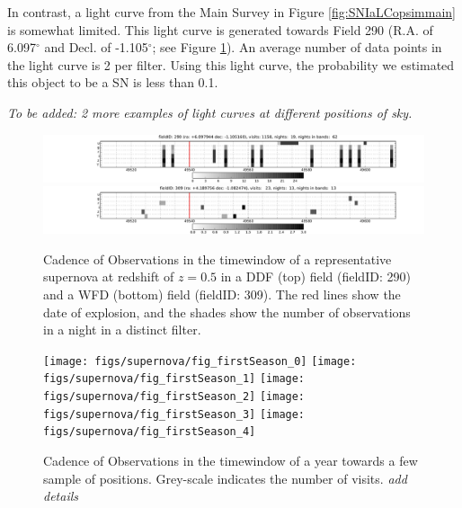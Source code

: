 In contrast, a light curve from the Main Survey in Figure \ref{fig:SNIaLCopsimmain} is
somewhat limited. 
This light curve is generated towards Field 290 (R.A. of 6.097$^{\circ}$
and Decl. of -1.105$^{\circ}$; see Figure \ref{fig:perSNCadence}). An average number of
data points in the light curve is 2 per filter. Using this light curve, the probability we
 estimated this object to be a SN is less than 0.1. 

\emph{To be added: 2 more examples of light curves at different positions of sky.}







\begin{figure}[tbh!]
\includegraphics[angle=0,width=\textwidth,clip]{figs/SN_Cadence_290.pdf}
\includegraphics[angle=0,width=\textwidth,clip]{figs/SN_Cadence_309.pdf}
\caption{Cadence of Observations in the timewindow of a representative supernova at redshift of $z=0.5$ in a DDF (top) field (fieldID: 290) and a WFD (bottom) field (fieldID: 309). The red lines show the date of explosion, and the shades show the number of observations in a night in a distinct filter.}
\label{fig:perSNCadence}
\end{figure}



\begin{figure}[!hb]
    \begin{minipage}[b]{\linewidth}
        \texttt{[image: figs/supernova/fig\_firstSeason\_0]}
        \texttt{[image: figs/supernova/fig\_firstSeason\_1]}
        \texttt{[image: figs/supernova/fig\_firstSeason\_2]}
        \texttt{[image: figs/supernova/fig\_firstSeason\_3]}
        \texttt{[image: figs/supernova/fig\_firstSeason\_4]}
    \end{minipage}
\label{fig:opsimSummary}
\caption{Cadence of Observations in the timewindow of a year towards a few sample of 
positions. Grey-scale indicates the number of visits. {\it add details} 
}
\end{figure}



